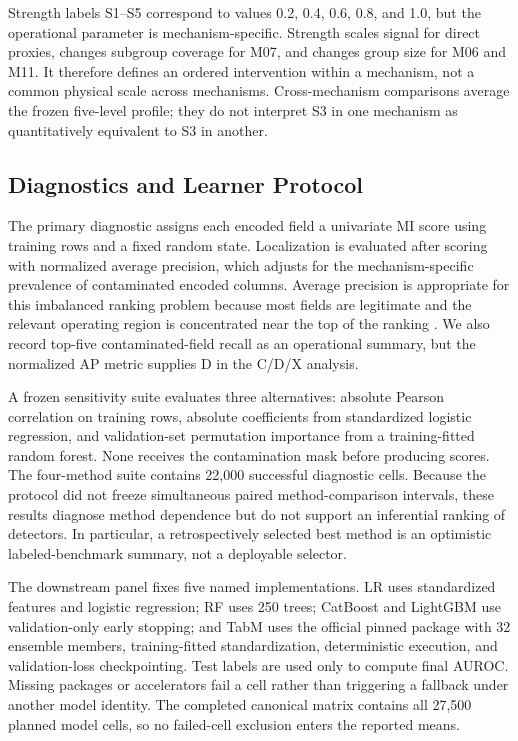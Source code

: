 \documentclass[sigconf,review]{acmart}
\begin{document}
Strength labels S1--S5 correspond to values 0.2, 0.4, 0.6, 0.8, and 1.0, but
the operational parameter is mechanism-specific. Strength scales signal for
direct proxies, changes subgroup coverage for M07, and changes group size for
M06 and M11. It therefore defines an ordered intervention within a mechanism,
not a common physical scale across mechanisms. Cross-mechanism comparisons
average the frozen five-level profile; they do not interpret S3 in one
mechanism as quantitatively equivalent to S3 in another.

\subsection{Diagnostics and Learner Protocol}

The primary diagnostic assigns each encoded field a univariate MI score using
training rows and a fixed random state. Localization is evaluated after scoring
with normalized average precision, which adjusts for the mechanism-specific
prevalence of contaminated encoded columns. Average precision is appropriate
for this imbalanced ranking problem because most fields are legitimate and the
relevant operating region is concentrated near the top of the ranking
\cite{saito2015precision}. We also record top-five contaminated-field recall as
an operational summary, but the normalized AP metric supplies D in the C/D/X
analysis.

A frozen sensitivity suite evaluates three alternatives: absolute Pearson
correlation on training rows, absolute coefficients from standardized logistic
regression, and validation-set permutation importance from a training-fitted
random forest. None receives the contamination mask before producing scores.
The four-method suite contains 22,000 successful diagnostic cells. Because the
protocol did not freeze simultaneous paired method-comparison intervals, these
results diagnose method dependence but do not support an inferential ranking of
detectors. In particular, a retrospectively selected best method is an
optimistic labeled-benchmark summary, not a deployable selector.

The downstream panel fixes five named implementations. LR uses standardized
features and logistic regression; RF uses 250 trees; CatBoost and LightGBM use
validation-only early stopping; and TabM uses the official pinned package with
32 ensemble members, training-fitted standardization, deterministic execution,
and validation-loss checkpointing. Test labels are used only to compute final
AUROC. Missing packages or accelerators fail a cell rather than triggering a
fallback under another model identity. The completed canonical matrix contains
all 27,500 planned model cells, so no failed-cell exclusion enters the reported
means.
\end{document}
